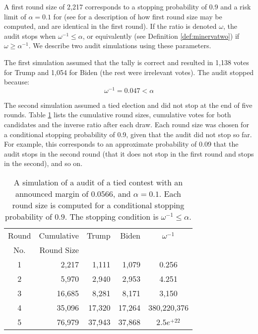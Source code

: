 A first round size of 2,217 corresponds to a stopping probability of 0.9 and a risk limit of $\alpha=0.1$ for \Providence (see \cite{usenix_minerva} for a description of how first round size may be computed, \Minerva and \Providence are identical in the first round). If the \Providence ratio is denoted $\omega$, the audit stops when $\omega^{-1} \leq \alpha$, or equivalently (see Definition \ref{def:minervatwo}) if $\omega \geq \alpha^{-1}$. We describe two audit simulations using these parameters. 

The first simulation assumed that the tally is correct and resulted in 1,138 votes for Trump and 1,054 for Biden (the rest were irrelevant votes). The audit stopped because: \[ \omega ^{-1} = 0.047 < \alpha \]

The second simulation assumed a tied election and did not stop at the end of five rounds. 
Table \ref{tab:toy} lists the cumulative round sizes, cumulative votes for both candidates and the inverse \Providence ratio after each draw. Each round size was chosen for a conditional stopping probability of 0.9, given that the audit did not stop so far. For example, this corresponds to an approximate probability of 0.09 that the audit stops in the second round (that it does not stop in the first round and stops in the second), and so on. 
\begin{table}[h]
\centering
\begin{tabular}{|crrrc|}
\hline
\hline
Round& Cumulative& Trump & Biden & $\omega^{-1}$  \\
 No. & Round Size &  & &  \\
\hline
\hline
1 & 2,217 & 1,111 & 1,079 & 0.256\\
2 & 5,970 & 2,940 & 2,953 & 4.251\\
3 & 16,685 & 8,281 & 8,171 & 3,150 \\
4 & 35,096 & 17,320 & 17,264 & 380,220,376 \\
5 & 76,979 & 37,943 & 37,868 & $2.5e^{+22}$ \\
\hline
\end{tabular}
\caption{A simulation of a \Providence audit of a tied contest with an announced margin of 0.0566, and $\alpha=0.1$. Each round size is computed for a conditional stopping probability of $0.9$. The stopping condition is $\omega^{-1} \le \alpha$.}
\label{tab:toy}
\end{table}

